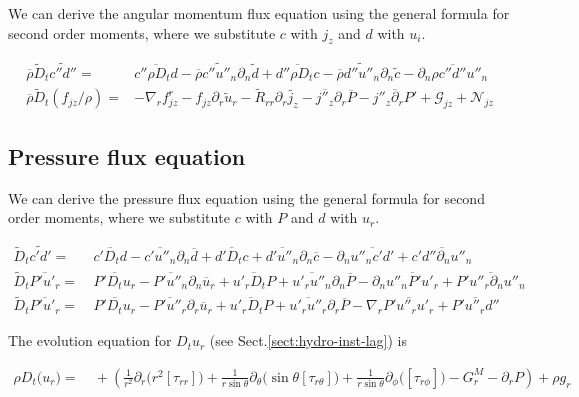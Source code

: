 \documentclass[10pt,paper=a4]{report}
\newcommand{\eht}{\overline}
\newcommand{\fht}{\widetilde}
\newcommand{\fav}{\widetilde}
\def\erho{\eht{\rho}}
\begin{document}
We can derive the angular momentum flux equation using the general formula for second order moments, where we substitute $c$ with $j_z$ and $d$ with $u_i$.

\begin{align}
\overline{\rho}\widetilde{D}_t \widetilde{c''d''} = & \overline{c'' \rho D_t d} - \overline{\rho} \widetilde{c''u''_n}\partial_n \widetilde{d} + \overline{d'' \rho D_t c} - \overline{\rho} \widetilde{d''u''_n}\partial_n \widetilde{c} - \overline{\partial_n \rho c''d''u''_n} \\
\erho \fav{D}_t (f_{jz} / \rho) = & -\nabla_r f_{jz}^r  - f_{jz} \partial_r \fht{u}_r - \fht{R}_{rr} \partial_r \fht{j_z} -\eht{j''_z} \partial_r \eht{P} - \eht{j''_z \partial_r P'} + {\mathcal G_{jz}} + {\mathcal N_{jz}} \label{eq:rans_fjz}
\end{align}

\subsection{Pressure flux equation}

We can derive the pressure flux equation using the general formula for second order moments, where we substitute $c$ with $P$ and $d$ with $u_r$.

\begin{align}
\widetilde{D}_t \widetilde{c'd'} = & \ \overline{c' D_t d} - \eht{c'u''_n} \partial_n \eht{d} + \eht{d'D_t c} + \eht{d'u''_n}\partial_n \eht{c} - \partial_n \eht{u''_n c'd'} + \eht{c'd''\partial_n u''_n} \nonumber \\ 
  \fht{D}_t \eht{P'u'_r} = & \ \eht{P'D_t u_r} - \eht{P'u''_n} \partial_n \eht{u}_r + \eht{u'_r D_t P} + \eht{u'_r u''_n} \partial_n \eht{P} - \partial_n \eht{u''_n P' u'_r} + \eht{P'u''_r \partial_n u''_n} \nonumber \\
  \fht{D}_t \eht{P'u'_r} = & \ \eht{P'D_t u_r} - \eht{P'u''_r} \partial_r \eht{u}_r + \eht{u'_r D_t P} + \eht{u'_r u''_r} \partial_r \eht{P} - \nabla_r \eht{P' u''_r u'_r} + \eht{P'u''_r d''} 
\end{align}

\noindent
The evolution equation for $D_t u_r$ (see Sect.\ref{sect:hydro-inst-lag}) is 

\begin{align}
\rho D_{t} \big(u_{r}\big) = & \ +\left( \frac{1}{r^{2}} \partial_{r} \big( r^{2} [\tau_{rr}]\big) + \frac{1}{r\sin{\theta}}\partial_{\theta}(\sin{\theta}[\tau_{r\theta}]\big) + \frac{1}{r\sin{\theta}}\partial_{\phi}\big([\tau_{r\phi}]\big) - G_r^M - \partial_{r} P \right) + \rho g_r 
\end{align}
\end{document}
